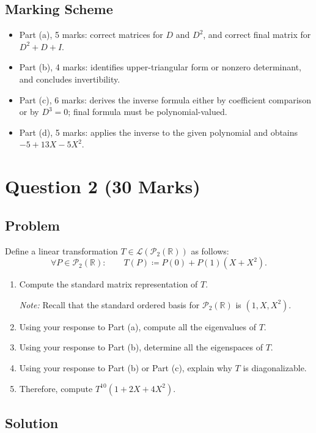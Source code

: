 \documentclass[12pt]{article}
\newcommand{\R}{\mathbb{R}}
\newcommand{\cP}{\mathcal{P}}
\newcommand{\cL}{\mathcal{L}}
\newcommand{\df}{\coloneqq}
\begin{document}
\subsection{Marking Scheme}
\begin{itemize}[leftmargin=*]
  \item Part (a), 5 marks: correct matrices for $D$ and $D^2$, and correct final matrix for $D^2+D+I$.
  \item Part (b), 4 marks: identifies upper-triangular form or nonzero determinant, and concludes invertibility.
  \item Part (c), 6 marks: derives the inverse formula either by coefficient comparison or by $D^3=0$; final formula must be polynomial-valued.
  \item Part (d), 5 marks: applies the inverse to the given polynomial and obtains $-5+13X-5X^2$.
\end{itemize}

\newpage
\section{Question 2 \hfill (30 Marks)}

\subsection{Problem}
Define a linear transformation $T\in\cL(\cP_2(\R))$ as follows:
\[
  \forall P\in\cP_2(\R):\qquad
  T(P)\df P(0)+P(1)(X+X^2).
\]
\begin{enumerate}[label=(\alph*)]
  \item Compute the standard matrix representation of $T$.

  \textit{Note:} Recall that the standard ordered basis for $\cP_2(\R)$ is $(1,X,X^2)$.
  \item Using your response to Part (a), compute all the eigenvalues of $T$.
  \item Using your response to Part (b), determine all the eigenspaces of $T$.
  \item Using your response to Part (b) or Part (c), explain why $T$ is diagonalizable.
  \item Therefore, compute $T^{10}(1+2X+4X^2)$.
\end{enumerate}

\newpage
\subsection{Solution}
\end{document}

